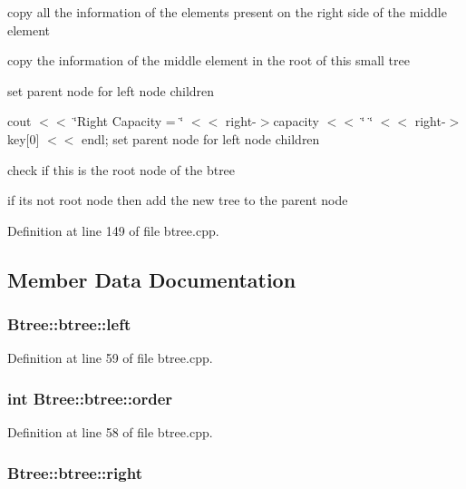 copy all the information of the elements present on the right side of the middle element

copy the information of the middle element in the root of this small tree

set parent node for left node children

cout $<$$<$ \char`\"{}\-Right Capacity = \char`\"{} $<$$<$ right-\/$>$capacity $<$$<$ \char`\"{} \char`\"{} $<$$<$ right-\/$>$key\mbox{[}0\mbox{]} $<$$<$ endl; set parent node for left node children

check if this is the root node of the btree

if its not root node then add the new tree to the parent node 

Definition at line 149 of file btree.\-cpp.



\subsection{Member Data Documentation}
\hypertarget{class_btree_1_1btree_ac87987e8e86b424c75a859b1517e29d1}{
\subsubsection[{left}]{ Btree\-::btree\-::left}}\label{class_btree_1_1btree_ac87987e8e86b424c75a859b1517e29d1}


Definition at line 59 of file btree.\-cpp.

\hypertarget{class_btree_1_1btree_aebbdfbfb5bbb9069158193873af48102}{
\subsubsection[{order}]{\setlength{\rightskip}{0pt plus 5cm}int Btree\-::btree\-::order}}\label{class_btree_1_1btree_aebbdfbfb5bbb9069158193873af48102}


Definition at line 58 of file btree.\-cpp.

\hypertarget{class_btree_1_1btree_a36d46e46beffb8eca651db720fbd9f2e}{
\subsubsection[{right}]{ Btree\-::btree\-::right}}\label{class_btree_1_1btree_a36d46e46beffb8eca651db720fbd9f2e}


